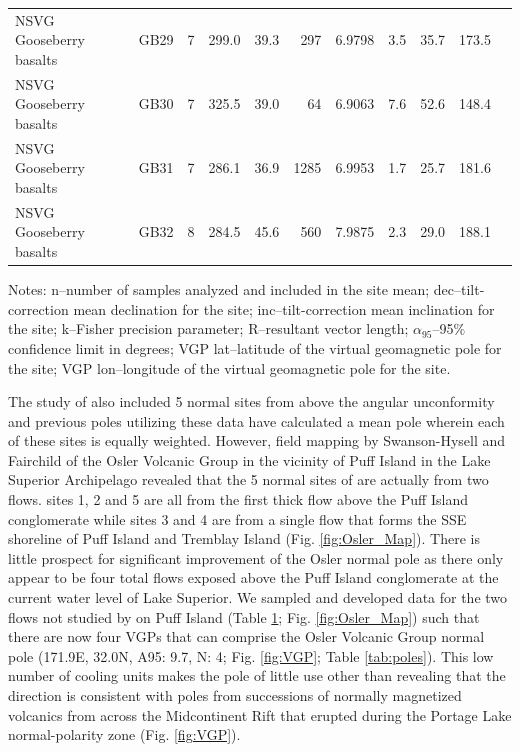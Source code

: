 \documentclass[11pt,letterpaper]{article}
\begin{document}
\begin{table}[h!]
\begin{tabular}{|l|l|l|r|r|r|r|r|r|r|r|}
NSVG Gooseberry basalts & GB29 &  7 &  299.0 &  39.3 &  297 &  6.9798 &  3.5 &  35.7 &  173.5 \\
NSVG Gooseberry basalts & GB30 &  7 &  325.5 &  39.0 &  64 &  6.9063 &  7.6 &  52.6 &  148.4 \\
NSVG Gooseberry basalts & GB31 &  7 &  286.1 &  36.9 &  1285 &  6.9953 &  1.7 &  25.7 &  181.6 \\
NSVG Gooseberry basalts & GB32 &  8 &  284.5 &  45.6 &  560 &  7.9875 &  2.3 &  29.0 &  188.1 \\
\hline
\end{tabular}
\begin{tablenotes}
Notes: n--number of samples analyzed and included in the site mean; dec--tilt-correction mean declination for the site; inc--tilt-correction mean inclination for the site; k--Fisher precision parameter; R--resultant vector length; $\alpha_{95}$--95$\%$ confidence limit in degrees; VGP lat--latitude of the virtual geomagnetic pole for the site; VGP lon--longitude of the virtual geomagnetic pole for the site.
\end{tablenotes}

\label{tab:pmag_sites}
\end{table}

The study of \cite{Halls1974a} also included 5 normal sites from above the angular unconformity and previous poles utilizing these data have calculated a mean pole wherein each of these sites is equally weighted. However, field mapping by Swanson-Hysell and Fairchild of the Osler Volcanic Group in the vicinity of Puff Island in the Lake Superior Archipelago revealed that the 5 normal sites of \cite{Halls1974a} are actually from two flows. \cite{Halls1974a} sites 1, 2 and 5 are all from the first thick flow above the Puff Island conglomerate while sites 3 and 4 are from a single flow that forms the SSE shoreline of Puff Island and Tremblay Island (Fig. \ref{fig:Osler_Map}). There is little prospect for significant improvement of the Osler normal pole as there only appear to be four total flows exposed above the Puff Island conglomerate at the current water level of Lake Superior. We sampled and developed data for the two flows not studied by \cite{Halls1974a} on Puff Island (Table \ref{tab:pmag_sites}; Fig. \ref{fig:Osler_Map}) such that there are now four VGPs that can comprise the Osler Volcanic Group normal pole (171.9\textdegree E, 32.0\textdegree N, A95: 9.7\textdegree, N: 4; Fig. \ref{fig:VGP}; Table \ref{tab:poles}). This low number of cooling units makes the pole of little use other than revealing that the direction is consistent with poles from successions of normally magnetized volcanics from across the Midcontinent Rift that erupted during the Portage Lake normal-polarity zone (Fig. \ref{fig:VGP}).
\end{document}
